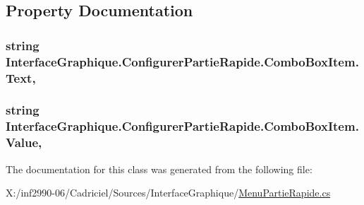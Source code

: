 \subsection{Property Documentation}
\hypertarget{class_interface_graphique_1_1_configurer_partie_rapide_1_1_combo_box_item_a49c8c93698b147b8cf0a7e4f7b20fc3e}{
\subsubsection[{Text}]{\setlength{\rightskip}{0pt plus 5cm}string Interface\-Graphique.\-Configurer\-Partie\-Rapide.\-Combo\-Box\-Item.\-Text\hspace{0.3cm}{\ttfamily [get]}, {\ttfamily [set]}}}\label{class_interface_graphique_1_1_configurer_partie_rapide_1_1_combo_box_item_a49c8c93698b147b8cf0a7e4f7b20fc3e}
\hypertarget{class_interface_graphique_1_1_configurer_partie_rapide_1_1_combo_box_item_abe3a9af3f056a3f9b78355ba4a352cda}{
\subsubsection[{Value}]{\setlength{\rightskip}{0pt plus 5cm}string Interface\-Graphique.\-Configurer\-Partie\-Rapide.\-Combo\-Box\-Item.\-Value\hspace{0.3cm}{\ttfamily [get]}, {\ttfamily [set]}}}\label{class_interface_graphique_1_1_configurer_partie_rapide_1_1_combo_box_item_abe3a9af3f056a3f9b78355ba4a352cda}


The documentation for this class was generated from the following file\-:\begin{DoxyCompactItemize}
\item 
X\-:/inf2990-\/06/\-Cadriciel/\-Sources/\-Interface\-Graphique/\hyperlink{_menu_partie_rapide_8cs}{Menu\-Partie\-Rapide.\-cs}\end{DoxyCompactItemize}
